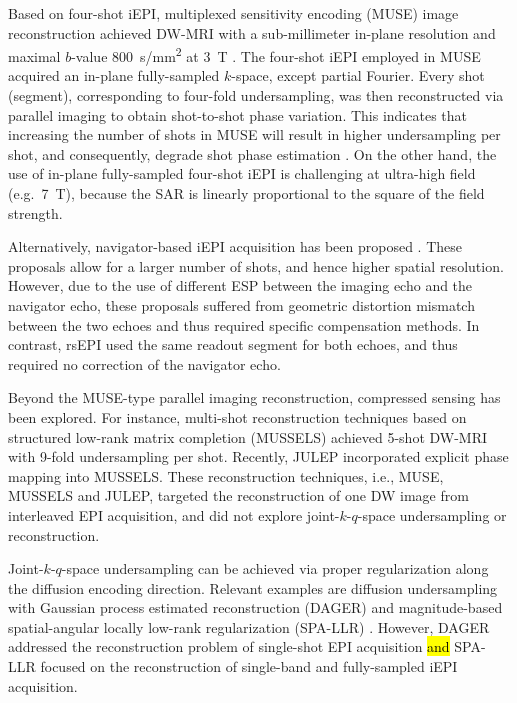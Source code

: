 \documentclass[preprint,12pt,authoryear,review]{elsarticle}
\begin{document}
    Based on four-shot iEPI,
    multiplexed sensitivity encoding (MUSE) image reconstruction
    achieved DW-MRI with a sub-millimeter in-plane resolution
    and maximal $b$-value \SI{800}{s/mm^2} at \SI{3}{\tesla}
    \citep{chen_2013_muse}.
    The four-shot iEPI employed in MUSE acquired
    an in-plane fully-sampled $k$-space, except partial Fourier.
    Every shot (segment), corresponding to four-fold undersampling,
    was then reconstructed via parallel imaging
    to obtain shot-to-shot phase variation.
    This indicates that increasing the number of shots in MUSE
    will result in higher undersampling per shot,
    and consequently, degrade shot phase estimation \citep{wu_2017_diff}.
    On the other hand, the use of in-plane fully-sampled four-shot iEPI
    is challenging at ultra-high field (e.g.~\SI{7}{\tesla}),
    because the SAR is linearly proportional
    to the square of the field strength.

    Alternatively, navigator-based iEPI acquisition has been proposed
    \citep{jeong_2013_navims,dai_2017_navi,dai_2018_navi}.
    These proposals allow for a larger number of shots,
    and hence higher spatial resolution.
    However, due to the use of different ESP
    between the imaging echo and the navigator echo,
    these proposals suffered from geometric distortion mismatch
    between the two echoes and thus required specific compensation methods.
    In contrast, rsEPI \citep{porter_2009_resolve,heidemann_2010_resolve7t}
    used the same readout segment for both echoes,
    and thus required no correction of the navigator echo.

    Beyond the MUSE-type parallel imaging reconstruction,
    compressed sensing \citep{lustig_2007_cs,block_2007_cs}
    has been explored.
    For instance, multi-shot reconstruction techniques
    based on structured low-rank matrix completion (MUSSELS)
    \citep{mani_2017_mussels,bilgic_2019_neatr} achieved
    5-shot DW-MRI with 9-fold undersampling per shot.
    Recently, JULEP \citep{dai_2023_julep}
    incorporated explicit phase mapping into MUSSELS.
    These reconstruction techniques, i.e., MUSE, MUSSELS and JULEP,
    targeted the reconstruction of one DW image
    from interleaved EPI acquisition,
    and did not explore joint-$k$-$q$-space undersampling or reconstruction.

    Joint-$k$-$q$-space undersampling can be achieved
    via proper regularization along the diffusion encoding direction.
    Relevant examples are diffusion undersampling
    with Gaussian process estimated reconstruction (DAGER)
    \citep{wu_2019_dager} and
    magnitude-based spatial-angular locally low-rank regularization
    (SPA-LLR) \citep{hu_2020_spa_llr}.
    However, DAGER addressed the reconstruction problem
    of single-shot EPI acquisition \hl{and} 
    SPA-LLR focused on the reconstruction
    of single-band and fully-sampled iEPI acquisition.
\end{document}
